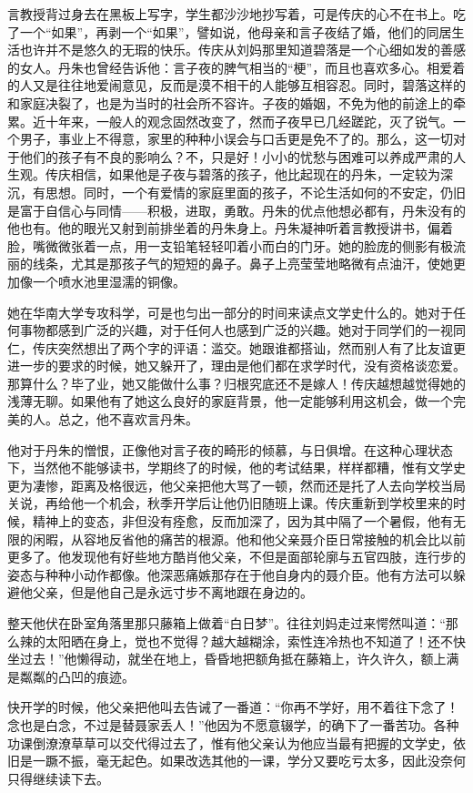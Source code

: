 \documentclass[UTF8]{ctexart}
\begin{document}
言教授背过身去在黑板上写字，学生都沙沙地抄写着，可是传庆的心不在书上。吃了一个“如果”，再剥一个“如果”，譬如说，他母亲和言子夜结了婚，他们的同居生活也许并不是悠久的无瑕的快乐。传庆从刘妈那里知道碧落是一个心细如发的善感的女人。丹朱也曾经告诉他：言子夜的脾气相当的“梗”，而且也喜欢多心。相爱着的人又是往往地爱闹意见，反而是漠不相干的人能够互相容忍。同时，碧落这样的和家庭决裂了，也是为当时的社会所不容许。子夜的婚姻，不免为他的前途上的牵累。近十年来，一般人的观念固然改变了，然而子夜早已几经蹉跎，灭了锐气。一个男子，事业上不得意，家里的种种小误会与口舌更是免不了的。那么，这一切对于他们的孩子有不良的影响么？不，只是好！小小的忧愁与困难可以养成严肃的人生观。传庆相信，如果他是子夜与碧落的孩子，他比起现在的丹朱，一定较为深沉，有思想。同时，一个有爱情的家庭里面的孩子，不论生活如何的不安定，仍旧是富于自信心与同情——积极，进取，勇敢。丹朱的优点他想必都有，丹朱没有的他也有。他的眼光又射到前排坐着的丹朱身上。丹朱凝神听着言教授讲书，偏着脸，嘴微微张着一点，用一支铅笔轻轻叩着小而白的门牙。她的脸庞的侧影有极流丽的线条，尤其是那孩子气的短短的鼻子。鼻子上亮莹莹地略微有点油汗，使她更加像一个喷水池里湿濡的铜像。

她在华南大学专攻科学，可是也匀出一部分的时间来读点文学史什么的。她对于任何事物都感到广泛的兴趣，对于任何人也感到广泛的兴趣。她对于同学们的一视同仁，传庆突然想出了两个字的评语：滥交。她跟谁都搭讪，然而别人有了比友谊更进一步的要求的时候，她又躲开了，理由是他们都在求学时代，没有资格谈恋爱。那算什么？毕了业，她又能做什么事？归根究底还不是嫁人！传庆越想越觉得她的浅薄无聊。如果他有了她这么良好的家庭背景，他一定能够利用这机会，做一个完美的人。总之，他不喜欢言丹朱。

他对于丹朱的憎恨，正像他对言子夜的畸形的倾慕，与日俱增。在这种心理状态下，当然他不能够读书，学期终了的时候，他的考试结果，样样都糟，惟有文学史更为凄惨，距离及格很远，他父亲把他大骂了一顿，然而还是托了人去向学校当局关说，再给他一个机会，秋季开学后让他仍旧随班上课。传庆重新到学校里来的时候，精神上的变态，非但没有痊愈，反而加深了，因为其中隔了一个暑假，他有无限的闲暇，从容地反省他的痛苦的根源。他和他父亲聂介臣日常接触的机会比以前更多了。他发现他有好些地方酷肖他父亲，不但是面部轮廓与五官四肢，连行步的姿态与种种小动作都像。他深恶痛嫉那存在于他自身内的聂介臣。他有方法可以躲避他父亲，但是他自己是永远寸步不离地跟在身边的。

整天他伏在卧室角落里那只藤箱上做着“白日梦”。往往刘妈走过来愕然叫道：“那么辣的太阳晒在身上，觉也不觉得？越大越糊涂，索性连冷热也不知道了！还不快坐过去！”他懒得动，就坐在地上，昏昏地把额角抵在藤箱上，许久许久，额上满是粼粼的凸凹的痕迹。

快开学的时候，他父亲把他叫去告诫了一番道：“你再不学好，用不着往下念了！念也是白念，不过是替聂家丢人！”他因为不愿意辍学，的确下了一番苦功。各种功课倒潦潦草草可以交代得过去了，惟有他父亲认为他应当最有把握的文学史，依旧是一蹶不振，毫无起色。如果改选其他的一课，学分又要吃亏太多，因此没奈何只得继续读下去。
\end{document}
